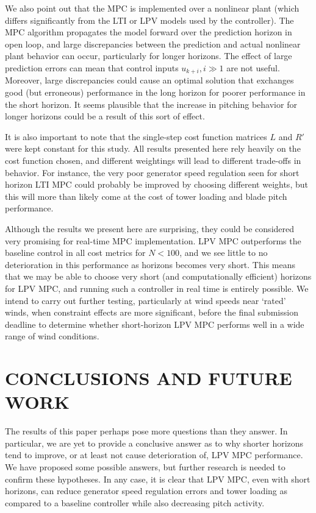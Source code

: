 \documentclass[letterpaper, 10 pt, conference]{ieeeconf}  %
\begin{document}
We also point out that the MPC is implemented over a nonlinear plant (which differs significantly from the LTI or LPV models used by the controller). The MPC algorithm propagates the model forward over the prediction horizon in open loop, and large discrepancies between the prediction and actual nonlinear plant behavior can occur, particularly for longer horizons. The effect of large prediction errors can mean that control inputs $u_{k+i}, i \gg 1$ are not useful. Moreover, large discrepancies could cause an optimal solution that exchanges good (but erroneous) performance in the long horizon for poorer performance in the short horizon. It seems plausible that the increase in pitching behavior for longer horizons could be a result of this sort of effect.

It is also important to note that the single-step cost function matrices $L$ and $R'$ were kept constant for this study. All results presented here rely heavily on the cost function chosen, and different weightings will lead to different trade-offs in behavior. For instance, the very poor generator speed regulation seen for short horizon LTI MPC could probably be improved by choosing different weights, but this will more than likely come at the cost of tower loading and blade pitch performance.

Although the results we present here are surprising, they could be considered very promising for real-time MPC implementation. LPV MPC outperforms the baseline control in all cost metrics for $N < 100$, and we see little to no deterioration in this performance as horizons becomes very short. This means that we may be able to choose very short (and computationally efficient) horizons for LPV MPC, and running such a controller in real time is entirely possible. We intend to carry out further testing, particularly at wind speeds near `rated' winds, when constraint effects are more significant, before the final submission deadline to determine whether short-horizon LPV MPC performs well in a wide range of wind conditions. 

\section{CONCLUSIONS AND FUTURE WORK}\label{sec:Concl}

The results of this paper perhaps pose more questions than they answer. In particular, we are yet to provide a conclusive answer as to why shorter horizons tend to improve, or at least not cause deterioration of, LPV MPC performance. We have proposed some possible answers, but further research is needed to confirm these hypotheses. In any case, it is clear that LPV MPC, even with short horizons, can reduce generator speed regulation errors and tower loading as compared to a baseline controller while also decreasing pitch activity.
\end{document}
